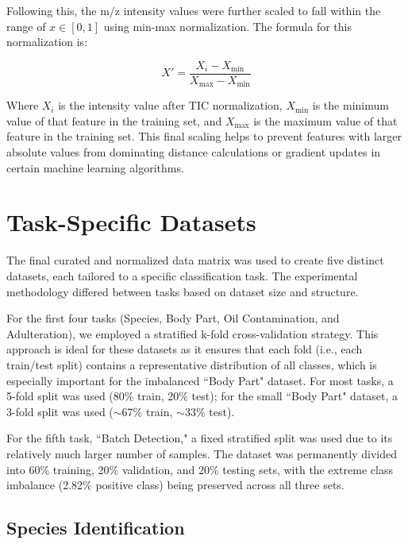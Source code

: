 Following this, the $\text{m/z}$ intensity values were further scaled to fall within the range of $x\in[0,1]$ using min-max normalization. The formula for this normalization is:

\begin{equation}
\label{eq:1}
X' = \frac{X_i - X_{\min}}{X_{\max} - X_{\min}}
\end{equation}

Where $X_{i}$ is the intensity value after TIC normalization, $X_{\min}$ is the minimum value of that feature in the training set, and $X_{\max}$ is the maximum value of that feature in the training set. This final scaling helps to prevent features with larger absolute values from dominating distance calculations or gradient updates in certain machine learning algorithms.

\section{Task-Specific Datasets}
\label{sec:task_specific_datasets}

The final curated and normalized data matrix was used to create five distinct datasets, each tailored to a specific classification task. The experimental methodology differed between tasks based on dataset size and structure.

For the first four tasks (Species, Body Part, Oil Contamination, and Adulteration), we employed a stratified k-fold cross-validation strategy. This approach is ideal for these datasets as it ensures that each fold (i.e., each train/test split) contains a representative distribution of all classes, which is especially important for the imbalanced ``Body Part" dataset. For most tasks, a 5-fold split was used (80\% train, 20\% test); for the small ``Body Part" dataset, a 3-fold split was used ($\sim$67\% train, $\sim$33\% test).

For the fifth task, ``Batch Detection," a fixed stratified split was used due to its relatively much larger number of samples. The dataset was permanently divided into 60\% training, 20\% validation, and 20\% testing sets, with the extreme class imbalance (2.82\% positive class) being preserved across all three sets.

\subsection{Species Identification}

